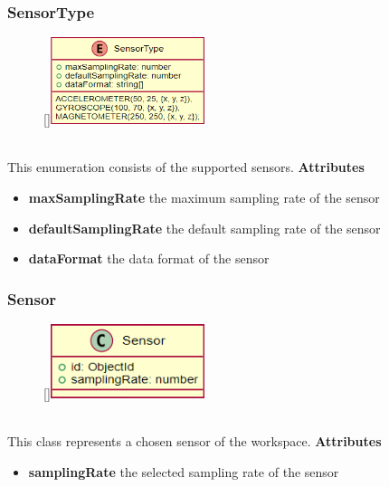 \newpage
\subsubsection{SensorType}
\label{SensorType}
\begin{figure}
    \raisebox{0pt}[\dimexpr{}\baselineskip\relax]{\includegraphics[width=4.5cm]{classes/workspace-management/4.png}}
\end{figure} 
~\\
This enumeration consists of the supported sensors.
\newline
\newline
\newline
\newline
\newline
\newline
\textbf{Attributes}
\begin{itemize}
    \item \textbf{maxSamplingRate} the maximum sampling rate of the sensor
    \item \textbf{defaultSamplingRate} the default sampling rate of the sensor
    \item \textbf{dataFormat} the data format of the sensor
\end{itemize}

\subsubsection{Sensor}
\label{Sensor}
\begin{figure}
    \raisebox{0pt}[\dimexpr{}\baselineskip\relax]{\includegraphics[width=4.5cm]{classes/workspace-management/3.png}}
\end{figure} 
~\\
This class represents a chosen sensor of the workspace. 
\newline
\newline
\newline
\newline
\newline
\textbf{Attributes}
\begin{itemize}
    \item \textbf{samplingRate} the selected sampling rate of the sensor
\end{itemize}

